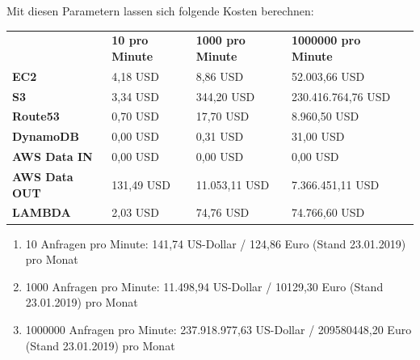 \documentclass[a4paper, 12pt]{scrreprt}
\renewcommand\_{\textunderscore\allowbreak}
\begin{document}
Mit diesen Parametern lassen sich folgende Kosten berechnen:

\begin{table}[]
\begin{tabular}{|l|l|l|l|l}
\cline{1-4}
          & \textbf{10 pro Minute} & \textbf{1000 pro Minute} & \textbf{1000000 pro Minute} &  \\ \cline{1-4}
\textbf{EC2} & 4,18 USD & 8,86 USD & 52.003,66 USD &  \\ 
\cline{1-4}
\textbf{S3} & 3,34 USD & 344,20 USD &     230.416.764,76 USD &  \\ 
\cline{1-4}
\textbf{Route53} & 0,70 USD & 17,70 USD & 8.960,50 USD &  \\ 
\cline{1-4}
\textbf{DynamoDB} & 0,00 USD & 0,31 USD & 31,00 USD &  \\ 
\cline{1-4}
\textbf{AWS Data IN} & 0,00 USD & 0,00 USD & 0,00 USD      &  \\ 
\cline{1-4}
\textbf{AWS Data OUT} & 131,49 USD & 11.053,11 USD & 7.366.451,11 USD &  \\
\cline{1-4}
\textbf{LAMBDA} & 2,03 USD & 74,76 USD & 74.766,60 USD &  \\ \cline{1-4}
\end{tabular}
\end{table}

\begin{enumerate}
	\item 10 Anfragen pro Minute: 141,74 US-Dollar / 124,86 Euro (Stand 23.01.2019) pro Monat
	\item 1000 Anfragen pro Minute: 11.498,94 US-Dollar / 10129,30 Euro (Stand 23.01.2019) pro Monat
	\item 1000000 Anfragen pro Minute: 237.918.977,63 US-Dollar / 209580448,20 Euro (Stand 23.01.2019) pro Monat 
\end{enumerate}

\end{document}

